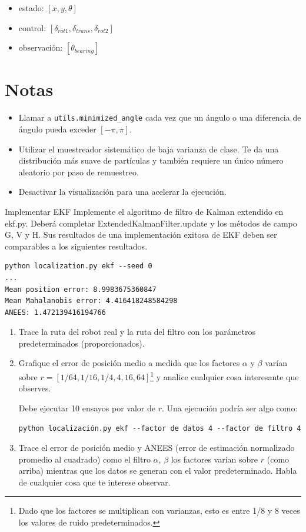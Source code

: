\documentclass[tp]{lcc}
\begin{document}
	\begin{itemize}
		\item estado: $[x,y,\theta]$
		\item control: $[\delta_{rot1},\delta_{trans},\delta_{rot2}]$
		\item observación: $[\theta_{bearing}]$
	\end{itemize}
	
	\section{Notas}
	\begin{itemize}
		\item Llamar a \lstinline[style=bash]{utils.minimized_angle} cada vez que un ángulo o una diferencia de ángulo pueda exceder $[-\pi, \pi]$.
		\item Utilizar el muestreador sistemático de baja varianza de clase. Te da una distribución más suave de partículas y también requiere un único número aleatorio por paso de remuestreo.
		\item Desactivar la visualización para una acelerar la ejecución.
	\end{itemize}

	\ejercicio Implementar EKF
	Implemente el algoritmo de filtro de Kalman extendido en ekf.py. Deberá completar ExtendedKalmanFilter.update
	y los métodos de campo G, V y H. Sus resultados de una implementación exitosa de EKF deben ser comparables
	a los siguientes resultados.

\begin{lstlisting}[style=bash] 
python localization.py ekf --seed 0
...
Mean position error: 8.9983675360847
Mean Mahalanobis error: 4.416418248584298
ANEES: 1.472139416194766
\end{lstlisting}


	\begin{enumerate}
		\item Trace la ruta del robot real y la ruta del filtro con los parámetros predeterminados (proporcionados).
		\item  Grafique el error de posición medio a medida que los factores $\alpha$ y $\beta$ varían sobre $r = [1/64, 1/16, 1/4, 4, 16, 64]$\footnote{Dado que los factores se multiplican con varianzas, esto es entre 1/8 y 8 veces los valores de ruido predeterminados.} y analice cualquier cosa interesante que observes.
		
		Debe ejecutar 10 ensayos por valor de $r$. Una ejecución podría ser algo como:

\begin{lstlisting}[style=bash] 
python localización.py ekf --factor de datos 4 --factor de filtro 4
\end{lstlisting}

		\item Trace el error de posición medio y ANEES (error de estimación normalizado promedio al cuadrado) como el filtro $\alpha$, $\beta$ los factores varían sobre $r$ (como arriba) mientras que los datos se generan con el valor predeterminado. Habla de cualquier cosa que te interese observar.
	\end{enumerate}
\end{document}

